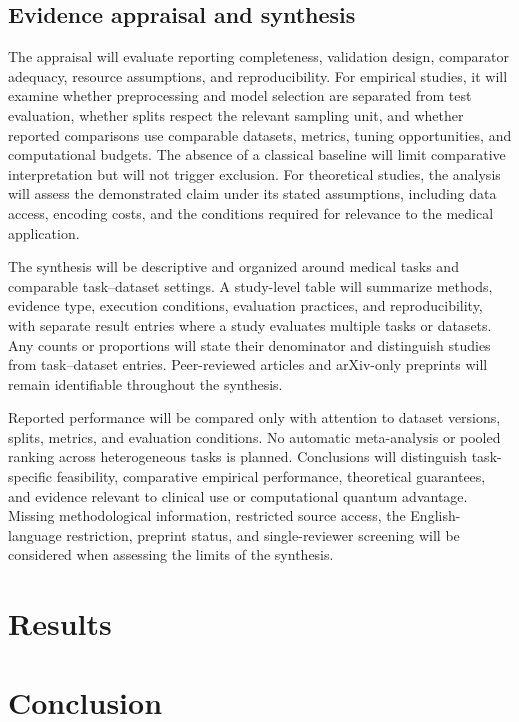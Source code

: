 \documentclass[pdflatex,bst/sn-mathphys-num]{sn-jnl}
\begin{document}
\subsection{Evidence appraisal and synthesis}\label{sec:synthesis}

The appraisal will evaluate reporting completeness, validation design, comparator adequacy, resource assumptions, and reproducibility. For empirical studies, it will examine whether preprocessing and model selection are separated from test evaluation, whether splits respect the relevant sampling unit, and whether reported comparisons use comparable datasets, metrics, tuning opportunities, and computational budgets. The absence of a classical baseline will limit comparative interpretation but will not trigger exclusion. For theoretical studies, the analysis will assess the demonstrated claim under its stated assumptions, including data access, encoding costs, and the conditions required for relevance to the medical application.

The synthesis will be descriptive and organized around medical tasks and comparable task--dataset settings. A study-level table will summarize methods, evidence type, execution conditions, evaluation practices, and reproducibility, with separate result entries where a study evaluates multiple tasks or datasets. Any counts or proportions will state their denominator and distinguish studies from task--dataset entries. Peer-reviewed articles and arXiv-only preprints will remain identifiable throughout the synthesis.

Reported performance will be compared only with attention to dataset versions, splits, metrics, and evaluation conditions. No automatic meta-analysis or pooled ranking across heterogeneous tasks is planned. Conclusions will distinguish task-specific feasibility, comparative empirical performance, theoretical guarantees, and evidence relevant to clinical use or computational quantum advantage. Missing methodological information, restricted source access, the English-language restriction, preprint status, and single-reviewer screening will be considered when assessing the limits of the synthesis.

\section{Results}\label{sec:results}

\section{Conclusion}\label{sec:conclusion}
\end{document}
